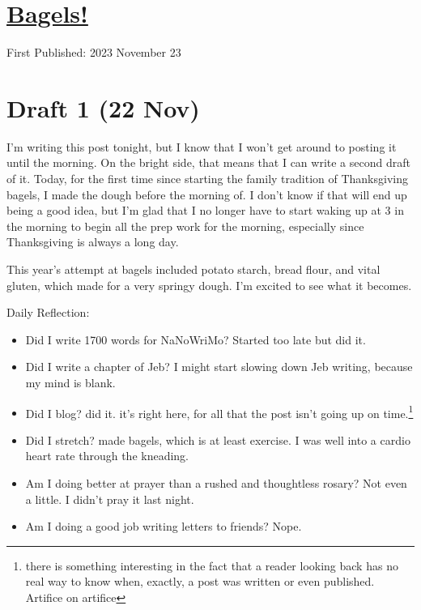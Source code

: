 \documentclass[12pt]{article}[titlepage]
\newcommand{\1}{\={a}}
\newcommand{\2}{\={e}}
\newcommand{\3}{\={\i}}
\newcommand{\4}{\=o}
\newcommand{\5}{\=u}
\newcommand{\6}{\={A}}
\renewcommand{\,}{\textsuperscript{,}}
\begin{document}
\doublespacing
\section{\href{bagels-23.html}{Bagels!}}
First Published: 2023 November 23
\section{Draft 1 (22 Nov)}
I'm writing this post tonight, but I know that I won't get around to posting it until the morning.
On the bright side, that means that I can write a second draft of it.
Today, for the first time since starting the family tradition of Thanksgiving bagels, I made the dough before the morning of.
I don't know if that will end up being a good idea, but I'm glad that I no longer have to start waking up at 3 in the morning to begin all the prep work for the morning, especially since Thanksgiving is always a long day.

This year's attempt at bagels included potato starch, bread flour, and vital gluten, which made for a very springy dough.
I'm excited to see what it becomes.

Daily Reflection:
\begin{itemize}
\item Did I write 1700 words for NaNoWriMo? Started too late but did it.
\item Did I write a chapter of Jeb? I might start slowing down Jeb writing, because my mind is blank.
\item Did I blog? did it. it's right here, for all that the post isn't going up on time.\footnote{there is something interesting in the fact that a reader looking back has no real way to know when, exactly, a post was written or even published.
Artifice on artifice}
\item Did I stretch? made bagels, which is at least exercise. I was well into a cardio heart rate through the kneading.
\item Am I doing better at prayer than a rushed and thoughtless rosary? Not even a little. I didn't pray it last night.
\item Am I doing a good job writing letters to friends? Nope.
\end{itemize}
\end{document}
